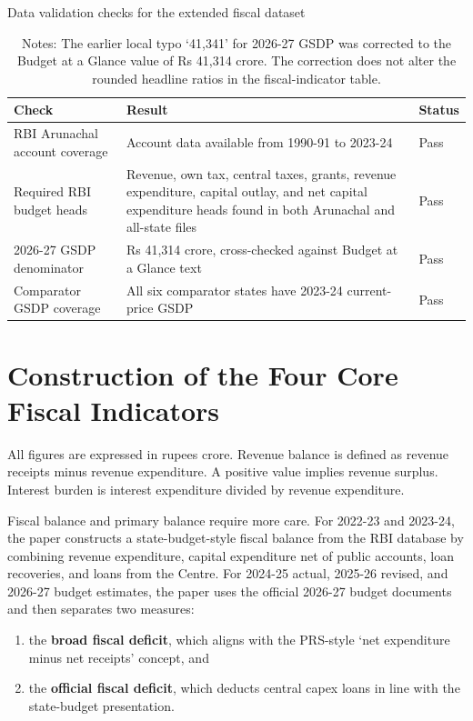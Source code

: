 \documentclass[11pt,a4paper]{article}
\begin{document}
\begin{table}[H]
\centering
\caption{Data validation checks for the extended fiscal dataset}
\small
\begin{tabular}{L{5.2cm}L{6.3cm}C{1.8cm}}
\toprule
Check & Result & Status \\
\midrule
RBI Arunachal account coverage & Account data available from 1990-91 to 2023-24 & Pass \\
Required RBI budget heads & Revenue, own tax, central taxes, grants, revenue expenditure, capital outlay, and net capital expenditure heads found in both Arunachal and all-state files & Pass \\
2026-27 GSDP denominator & Rs 41,314 crore, cross-checked against Budget at a Glance text & Pass \\
Comparator GSDP coverage & All six comparator states have 2023-24 current-price GSDP & Pass \\
\bottomrule
\end{tabular}
\caption*{\footnotesize Notes: The earlier local typo `41,341' for 2026-27 GSDP was corrected to the Budget at a Glance value of Rs 41,314 crore. The correction does not alter the rounded headline ratios in the fiscal-indicator table.}
\end{table}

\section{Construction of the Four Core Fiscal Indicators}

All figures are expressed in rupees crore. Revenue balance is defined as revenue receipts minus revenue expenditure. A positive value implies revenue surplus. Interest burden is interest expenditure divided by revenue expenditure.

Fiscal balance and primary balance require more care. For 2022-23 and 2023-24, the paper constructs a state-budget-style fiscal balance from the RBI database by combining revenue expenditure, capital expenditure net of public accounts, loan recoveries, and loans from the Centre. For 2024-25 actual, 2025-26 revised, and 2026-27 budget estimates, the paper uses the official 2026-27 budget documents and then separates two measures:

\begin{enumerate}
\item the \textbf{broad fiscal deficit}, which aligns with the PRS-style `net expenditure minus net receipts' concept, and
\item the \textbf{official fiscal deficit}, which deducts central capex loans in line with the state-budget presentation.
\end{enumerate}
\end{document}
